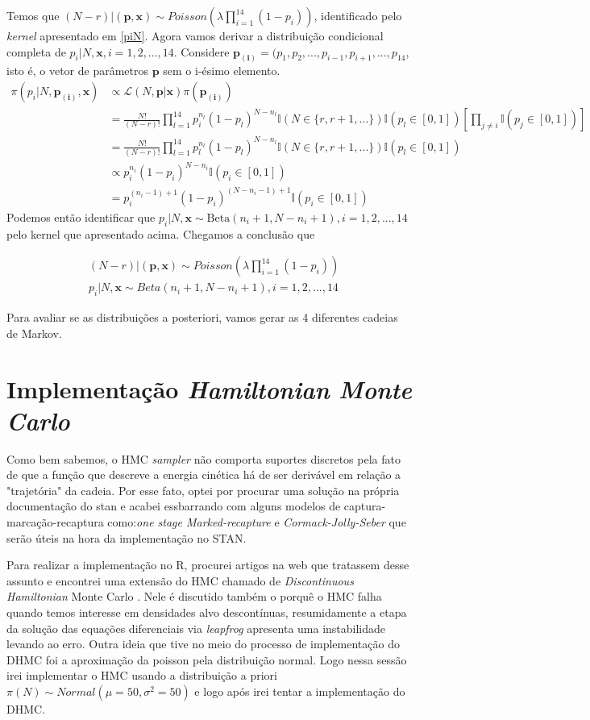 \documentclass[a4paper,12pt,twoside]{article}
\begin{document}
Temos que $(N-r)|(\mathbf{p,x})\sim Poisson(\lambda\prod_{i=1}^{14}(1-p_i))$, identificado pelo \textit{kernel} apresentado em \ref{piN}.
\newpage
\restoregeometry
Agora vamos derivar a distribuição condicional completa de $p_i|N,\mathbf{x}, i=1,2,...,14$. Considere $\mathbf{p_{(i)}}=(p_1,p_2,...,p_{i-1},p_{i+1},...,p_{14}$, isto é, o vetor de parâmetros $\mathbf{p}$ sem o i-ésimo elemento.
\begin{align*}
\pi(p_i|N,\mathbf{p_{(i)},x})&\propto \mathcal{L}(N,\mathbf{p}|\mathbf{x}) \pi(\mathbf{p_{(i)}})\\
& = \frac{N!}{(N-r)!}\prod_{l=1}^{14}p_{i}^{n_l}(1-p_l)^{N-n_l}\mathds{I}(N \in \{r,r+1,...\})\mathds{I}(p_l \in [0,1])\left[\prod_{j\neq i}\mathds{I}(p_j \in [0,1])\right]\\
& = \frac{N!}{(N-r)!}\prod_{l=1}^{14}p_{l}^{n_l}(1-p_l)^{N-n_l}\mathds{I}(N \in \{r,r+1,...\})\mathds{I}(p_l \in [0,1])\\
& \propto p_i^{n_i}(1-p_i)^{N-n_i}\mathds{I}(p_i \in [0,1])\\
& = p_i^{(n_i-1)+1}(1-p_i)^{(N-n_i-1)+1}\mathds{I}(p_i \in [0,1])
\end{align*}
Podemos então identificar que $p_i|N,\mathbf{x} \sim \text{Beta}(n_i+1,N-n_i+1), i=1,2,...,14$ pelo kernel que apresentado acima. Chegamos a conclusão que 

\begin{align}
& (N-r)|(\mathbf{p,x})\sim Poisson(\lambda\prod_{i=1}^{14}(1-p_i))\\
& p_i|N,\mathbf{x} \sim Beta(n_i+1,N-n_i+1), i=1,2,...,14
\end{align}

Para avaliar se as distribuições a posteriori, vamos gerar as 4 diferentes cadeias de Markov.

\newpage
\section{Implementação \textit{Hamiltonian Monte Carlo}}
Como bem sabemos, o HMC \textit{sampler} não comporta suportes discretos pela fato de que a função que descreve a energia cinética há de ser derivável em relação a "trajetória" da cadeia. Por esse fato, optei por procurar uma solução na própria documentação do stan e acabei essbarrando com alguns modelos de captura-marcação-recaptura como:\textit{one stage Marked-recapture} e \textit{Cormack-Jolly-Seber} que serão úteis na hora da implementação no STAN.

Para realizar a implementação no R, procurei artigos na web que tratassem desse assunto e encontrei uma extensão do HMC chamado de \textit{Discontinuous Hamiltonian} Monte Carlo \cite{dhmc}. Nele é discutido também o porquê o HMC falha quando temos interesse em densidades alvo descontínuas, resumidamente a etapa da solução das equações diferenciais via \textit{leapfrog} apresenta uma instabilidade levando ao erro. Outra ideia que tive no meio do processo de implementação do DHMC foi a aproximação da poisson pela distribuição normal. Logo nessa sessão irei implementar o HMC usando a distribuição a priori $\pi(N)\sim Normal(\mu = 50, \sigma^2=50)$ e logo após irei tentar a implementação do DHMC. 
\end{document}
